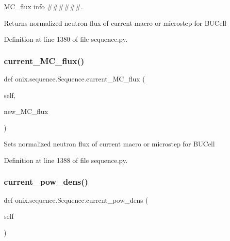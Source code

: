 M\+C\+\_\+flux info \#\#\#\#\#\#. 

\begin{DoxyVerb}Returns normalized neutron flux of current macro or microstep
for BUCell\end{DoxyVerb}
 

Definition at line 1380 of file sequence.\+py.

\mbox{\label{classonix_1_1sequence_1_1Sequence_a03156799257935680217e9de5227cdd0}} 
\subsubsection{\texorpdfstring{current\+\_\+\+M\+C\+\_\+flux()}{current\_MC\_flux()}\hspace{0.1cm}{\footnotesize\ttfamily [2/2]}}
{\footnotesize\ttfamily def onix.\+sequence.\+Sequence.\+current\+\_\+\+M\+C\+\_\+flux (\begin{DoxyParamCaption}\item[{}]{self,  }\item[{}]{new\+\_\+\+M\+C\+\_\+flux }\end{DoxyParamCaption})}

\begin{DoxyVerb}Sets normalized neutron flux of current macro or microstep
for BUCell\end{DoxyVerb}
 

Definition at line 1388 of file sequence.\+py.

\mbox{\label{classonix_1_1sequence_1_1Sequence_a336f7f417a7ae1a62734e3729b58e25b}} 
\subsubsection{\texorpdfstring{current\+\_\+pow\+\_\+dens()}{current\_pow\_dens()}\hspace{0.1cm}{\footnotesize\ttfamily [1/2]}}
{\footnotesize\ttfamily def onix.\+sequence.\+Sequence.\+current\+\_\+pow\+\_\+dens (\begin{DoxyParamCaption}\item[{}]{self }\end{DoxyParamCaption})}



